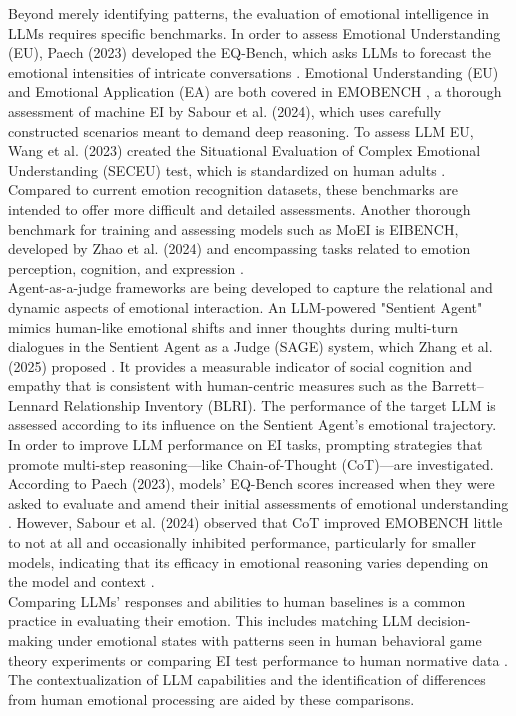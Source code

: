 \documentclass{DESSThesis}
\begin{document}
Beyond merely identifying patterns, the evaluation of emotional intelligence in LLMs requires specific benchmarks. In order to assess Emotional Understanding (EU), Paech (2023) developed the EQ-Bench, which asks LLMs to forecast the emotional intensities of intricate conversations \cite{paech_eq-bench_2024}. Emotional Understanding (EU) and Emotional Application (EA) are both covered in EMOBENCH \cite{sabour_emobench_2024}, a thorough assessment of machine EI by Sabour et al. (2024), which uses carefully constructed scenarios meant to demand deep reasoning. To assess LLM EU, Wang et al. (2023) created the Situational Evaluation of Complex Emotional Understanding (SECEU) test, which is standardized on human adults \cite{wang_emotional_2023}. Compared to current emotion recognition datasets, these benchmarks are intended to offer more difficult and detailed assessments. Another thorough benchmark for training and assessing models such as MoEI is EIBENCH, developed by Zhao et al. (2024) and encompassing tasks related to emotion perception, cognition, and expression \cite{zhao_both_2024}.
\\
Agent-as-a-judge frameworks are being developed to capture the relational and dynamic aspects of emotional interaction. An LLM-powered "Sentient Agent" mimics human-like emotional shifts and inner thoughts during multi-turn dialogues in the Sentient Agent as a Judge (SAGE) system, which Zhang et al. (2025) proposed \cite{zhang_sentient_2025}. It provides a measurable indicator of social cognition and empathy that is consistent with human-centric measures such as the Barrett–Lennard Relationship Inventory (BLRI). The performance of the target LLM is assessed according to its influence on the Sentient Agent's emotional trajectory.
\\
In order to improve LLM performance on EI tasks, prompting strategies that promote multi-step reasoning—like Chain-of-Thought (CoT)—are investigated. According to Paech (2023), models' EQ-Bench scores increased when they were asked to evaluate and amend their initial assessments of emotional understanding \cite{paech_eq-bench_2024}. However, Sabour et al. (2024) observed that CoT improved EMOBENCH little to not at all and occasionally inhibited performance, particularly for smaller models, indicating that its efficacy in emotional reasoning varies depending on the model and context \cite{sabour_emobench_2024}.
\\
Comparing LLMs' responses and abilities to human baselines is a common practice in evaluating their emotion. This includes matching LLM decision-making under emotional states with patterns seen in human behavioral game theory experiments \cite{mozikov_good_2024} or comparing EI test performance to human normative data \cite{wang_emotional_2023,sabour_emobench_2024}. The contextualization of LLM capabilities and the identification of differences from human emotional processing are aided by these comparisons.
\end{document}
